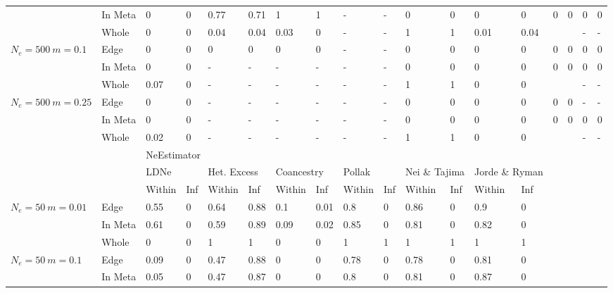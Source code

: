 \begin{landscape}
\begin{table}[h]
\begin{tabular}{ | l| l|| l| l| l| l| l| l| l| l| l| l| l| l| l| l| l| l| }
  & In Meta & 0 & 0 & 0.77 & 0.71 & 1 & 1 & - & - & 0 & 0 & 0 & 0 & 0 & 0 & 0 & 0  \\ \cline{2-18}
  & Whole & 0 & 0 & 0.04 & 0.04 & 0.03 & 0 & - & - & 1 & 1 & 0.01 & 0.04 &  &  & - & -  \\ \hline
\multirow{3}{1cm}{$N_e = 500 ~ m = 0.1$} & Edge & 0 & 0 & 0 & 0 & 0 & 0 & - & - & 0 & 0 & 0 & 0 & 0 & 0 & 0 & 0  \\ \cline{2-18}
  & In Meta & 0 & 0 & - & - & - & - & - & - & 0 & 0 & 0 & 0 & 0 & 0 & 0 & 0  \\ \cline{2-18}
  & Whole & 0.07 & 0 & - & - & - & - & - & - & 1 & 1 & 0 & 0 &  &  & - & -  \\ \hline
\multirow{3}{1cm}{$N_e = 500 ~ m = 0.25$} & Edge & 0 & 0 & - & - & - & - & - & - & 0 & 0 & 0 & 0 & 0 & 0 & - & -  \\ \cline{2-18}
  & In Meta & 0 & 0 & - & - & - & - & - & - & 0 & 0 & 0 & 0 & 0 & 0 & 0 & 0  \\ \cline{2-18}
  & Whole & 0.02 & 0 & - & - & - & - & - & - & 1 & 1 & 0 & 0 &  &  & - & -  \\ \hline \cline{1-14}
\multicolumn{2}{l}{} & \multicolumn{12}{l}{NeEstimator} & \multicolumn{4}{l}{} \\ \cline{1-14}
 \multicolumn{2}{l}{} & \multicolumn{2}{l}{LDNe} & \multicolumn{2}{l}{Het. Excess} & \multicolumn{2}{l}{Coancestry} & \multicolumn{2}{l}{Pollak} & \multicolumn{2}{l}{Nei \& Tajima} & \multicolumn{2}{l}{Jorde \& Ryman} & \multicolumn{4}{l}{} \\ \cline{1-14}
&  & Within & Inf & Within & Inf & Within & Inf & Within & Inf & Within & Inf & Within & Inf  &  \multicolumn{4}{l}{}  \\  \cline{1-14}
\multirow{3}{1cm}{$N_e = 50 ~ m = 0.01$} & Edge & 0.55 & 0 & 0.64 & 0.88 & 0.1 & 0.01 & 0.8 & 0 & 0.86 & 0 & 0.9 & 0  & \multicolumn{4}{l}{}  \\ \cline{2-14}
  & In Meta & 0.61 & 0 & 0.59 & 0.89 & 0.09 & 0.02 & 0.85 & 0 & 0.81 & 0 & 0.82 & 0 &  \multicolumn{4}{l}{}  \\ \cline{2-14}
  & Whole & 0 & 0 & 1 & 1 & 0 & 0 & 1 & 1 & 1 & 1 & 1 & 1 &  \multicolumn{4}{l}{}  \\ \cline{1-14}
\multirow{3}{1cm}{$N_e = 50 ~ m = 0.1$} & Edge & 0.09 & 0 & 0.47 & 0.88 & 0 & 0 & 0.78 & 0 & 0.78 & 0 & 0.81 & 0 &  \multicolumn{4}{l}{}  \\ \cline{2-14}
  & In Meta & 0.05 & 0 & 0.47 & 0.87 & 0 & 0 & 0.8 & 0 & 0.81 & 0 & 0.87 & 0 &  \multicolumn{4}{l}{}  \\ \cline{2-14}

\end{tabular}
\end{table}
\end{landscape}

